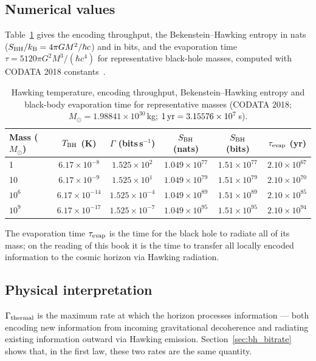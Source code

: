 \subsection{Numerical values}
Table~\ref{tab:bh_throughput} gives the encoding throughput, the Bekenstein--Hawking entropy in nats ($S_{\rm BH}/k_{\mathrm B}=4\pi GM^2/\hbar c$) and in bits, and the
evaporation time $\tau=5120\pi G^2M^3/(\hbar c^4)$ for representative black-hole masses, computed with CODATA 2018 constants~\cite{CODATA2018}. \calc
\begin{table}[htbp]\centering\small
\caption{Hawking temperature, encoding throughput, Bekenstein--Hawking entropy and black-body evaporation time for representative masses (CODATA 2018;
$M_\odot=1.98841\times10^{30}$\,kg; $1\,{\rm yr}=3.15576\times10^7$\,s). \calc}\label{tab:bh_throughput}
\begin{tabular}{lccccc}\toprule
Mass ($M_\odot$) & $T_{\rm BH}$ (K) & $\Gamma$ (bits\,s$^{-1}$) & $S_{\rm BH}$ (nats) & $S_{\rm BH}$ (bits) & $\tau_{\rm evap}$ (yr)\\\midrule
1 & $6.17\times10^{-8}$ & $1.525\times10^{2}$ & $1.049\times10^{77}$ & $1.51\times10^{77}$ & $2.10\times10^{67}$\\
10 & $6.17\times10^{-9}$ & $1.525\times10^{1}$ & $1.049\times10^{79}$ & $1.51\times10^{79}$ & $2.10\times10^{70}$\\
$10^{6}$ & $6.17\times10^{-14}$ & $1.525\times10^{-4}$ & $1.049\times10^{89}$ & $1.51\times10^{89}$ & $2.10\times10^{85}$\\
$10^{9}$ & $6.17\times10^{-17}$ & $1.525\times10^{-7}$ & $1.049\times10^{95}$ & $1.51\times10^{95}$ & $2.10\times10^{94}$\\\bottomrule
\end{tabular}
\end{table}
The evaporation time $\tau_{\rm evap}$ is the time for the black hole to radiate all of its mass; on the reading of this book it is the time to transfer all
locally encoded information to the cosmic horizon via Hawking radiation. \interp

\subsection{Physical interpretation}
$\Gamma_{\rm thermal}$ is the maximum rate at which the horizon processes information --- both encoding new information from incoming gravitational
decoherence and radiating existing information outward via Hawking emission. Section~\ref{sec:bh_bitrate} shows that, in the first law, these two rates are the
same quantity. \interp

